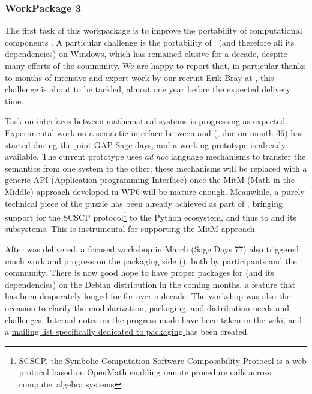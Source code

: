 \documentclass{deliverablereport}
\begin{document}
\TODO{}

  \subsubsection{WorkPackage 3}
  The first task of this workpackage is to improve the portability of computational
  components . A particular challenge is
  the portability of \Sage\ (and therefore all its dependencies) on Windows, which has
  remained elusive for a decade, despite many efforts of the community. We are happy to
  report that, in particular thanks to months of intensive and expert work by our recruit
  Erik Bray at , this challenge is about to be tackled, almost one year before
  the expected delivery time.

  Task  on interfaces between
  mathematical systems is progressing as expected. Experimental work on a semantic
  interface between \GAP and \Sage
  (, due on month 36) has
  started during the joint GAP-Sage days, and a working prototype is already
  available. The current prototype uses \emph{ad hoc} language mechanisms to transfer the
  semantics from one system to the other; these mechanisms will be replaced with a generic
  API (Application programming Interface) once the MitM (Math-in-the-Middle) approach
  developed in WP6 will be mature enough. Meanwhile, a purely technical piece of the
  puzzle has been already achieved as part of
  , bringing support for the SCSCP
  protocol\footnote{SCSCP, the
    \href{http://www.symbolic-computing.org/science/index.php/SCSCP}{Symbolic Computation
      Software Composability Protocol} is a web protocol based on OpenMath enabling remote
    procedure calls across computer algebra systems} to the Python ecosystem, and thus to
  \Sage and its subsystems. This is instrumental for supporting the MitM approach.

  After  was delivered, a focused
  workshop in March (Sage Days 77) also triggered much work and progress on the packaging
  side (), both by \ODK participants and
  the community. There is now good hope to have proper packages for \Sage (and its
  dependencies) on the Debian distribution in the coming months, a feature that has been
  desperately longed for for over a decade.  The workshop was also the occasion to clarify
  the modularization, packaging, and distribution needs and challenges. Internal notes on
  the progress made have been taken in the
  \href{https://wiki.sagemath.org/days77/packaging}{\Sage wiki}, and a
  \href{https://groups.google.com/forum/#!forum/sage-packaging}{mailing list specifically
    dedicated to packaging \Sage} has been created.
\end{document}
